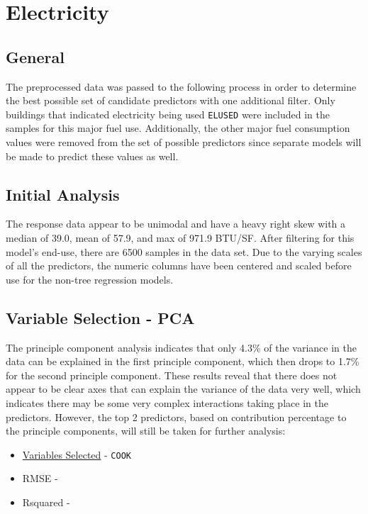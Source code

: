 \section*{Electricity}
\label{sec:electricity}

\subsection{General}

The preprocessed data was passed to the following process in order to determine the best possible set of candidate predictors with one additional filter.  Only buildings that indicated electricity being used \lstinline{ELUSED} were included in the samples for this major fuel use.  Additionally, the other major fuel consumption values were removed from the set of possible predictors since separate models will be made to predict these values as well.
\subsection{Initial Analysis}
The response data appear to be unimodal and have a heavy right skew with a median of 39.0, mean of 57.9, and max of 971.9 BTU/SF.  After filtering for this model's end-use, there are 6500 samples in the data set.  Due to the varying scales of all the predictors, the numeric columns have been centered and scaled before use for the non-tree regression models.

\subsection{Variable Selection - PCA}

The principle component analysis indicates that only 4.3\% of the variance in the data can be explained in the first principle component, which then drops to 1.7\% for the second principle component.  These results reveal that there does not appear to be clear axes that can explain the variance of the data very well, which indicates there may be some very complex interactions taking place in the predictors.  However, the top 2 predictors, based on contribution percentage to the principle components, will still be taken for further analysis:

\begin{itemize}
\item \hyperref[appendix:electricity:pca]{Variables Selected} - \lstinline{COOK}
\item RMSE - 
\item Rsquared -
\end{itemize}


